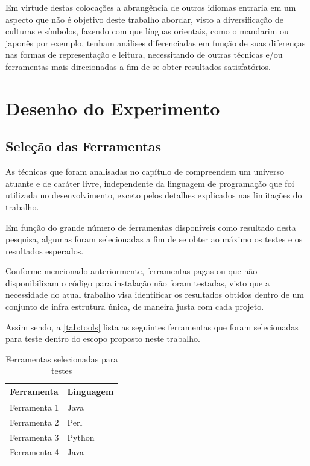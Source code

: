 \begin{textedited}
Em virtude destas colocações a abrangência de outros idiomas entraria em um aspecto que não é objetivo deste trabalho abordar, visto a diversificação de culturas e símbolos, fazendo com que línguas orientais, como o mandarim ou japonês por exemplo, tenham análises diferenciadas em função de suas diferenças nas formas de representação e leitura, necessitando de outras técnicas e/ou ferramentas mais direcionadas a fim de se obter resultados satisfatórios.
\end{textedited}



\section{Desenho do Experimento}
\label{sec:experiment-design}

\subsection{Seleção das Ferramentas}
\label{ssec:choosen-tools}

\begin{textedited}
As técnicas que foram analisadas no capítulo de  compreendem um universo atuante e de caráter livre, independente da linguagem de programação que foi utilizada no desenvolvimento, exceto pelos detalhes explicados nas limitações do trabalho.
\end{textedited}

Em função do grande número de ferramentas disponíveis como resultado desta pesquisa, algumas foram selecionadas a fim de se obter ao máximo os testes e os resultados esperados.

Conforme mencionado anteriormente, ferramentas pagas ou que não disponibilizam o código para instalação não foram testadas, visto que a necessidade do atual trabalho visa identificar os resultados obtidos dentro de um conjunto de infra estrutura única, de maneira justa com cada projeto.

Assim sendo, a \autoref{tab:tools} lista as seguintes ferramentas que foram selecionadas para teste dentro do escopo proposto neste trabalho.


\begin{table}
    \caption{Ferramentas selecionadas para testes}
    \begin{center}
        \begin{tabular}{|p{6cm}|p{5cm}|}
            \hline \textbf{Ferramenta} & \textbf{Linguagem} \\ 
            \hline Ferramenta 1 & Java\\
            \hline Ferramenta 2 & Perl\\
            \hline Ferramenta 3 & Python\\
            \hline Ferramenta 4 & Java\\
            \hline 
        \end{tabular} 
    \end{center}
    \label{tab:tools}
\end{table}

